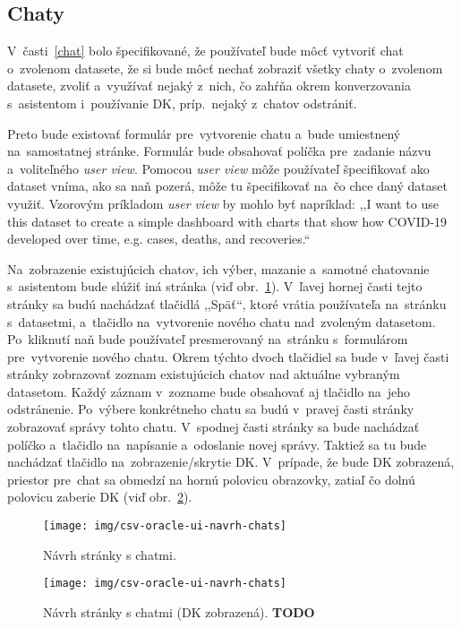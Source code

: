 \subsection{Chaty}

V~časti~\ref{chat} bolo špecifikované, že používateľ bude môcť vytvoriť chat o~zvolenom datasete, že si bude môcť nechať zobraziť všetky chaty o~zvolenom datasete, zvoliť a~využívať nejaký z~nich, čo zahŕňa okrem konverzovania s~asistentom i~používanie DK, príp.~nejaký z~chatov odstrániť.

Preto bude existovať formulár pre~vytvorenie chatu a~bude umiestnený na~samostatnej stránke. Formulár bude obsahovať políčka pre~zadanie názvu a~voliteľného \textit{user view}. Pomocou \textit{user view} môže používateľ špecifikovať ako dataset vníma, ako sa naň pozerá, môže tu špecifikovať na~čo chce daný dataset využiť. Vzorovým príkladom \textit{user view} by mohlo byť napríklad: ,,I want to use this dataset to create a simple dashboard with charts that show how COVID-19 developed over time, e.g. cases, deaths, and recoveries.``

Na~zobrazenie existujúcich chatov, ich výber, mazanie a~samotné chatovanie s~asistentom bude slúžiť iná stránka (viď obr.~\ref{csv-oracle-ui-navrh-chats}). V~ľavej hornej časti tejto stránky sa budú nachádzať tlačidlá ,,Späť``, ktoré vrátia používateľa na~stránku s~datasetmi, a~tlačidlo na~vytvorenie nového chatu nad~zvoleným datasetom. Po~kliknutí naň bude používateľ presmerovaný na~stránku s~formulárom pre~vytvorenie nového chatu. Okrem týchto dvoch tlačidiel sa bude v~ľavej časti stránky zobrazovať zoznam existujúcich chatov nad aktuálne vybraným datasetom. Každý záznam v~zozname bude obsahovať aj tlačidlo na~jeho odstránenie. Po~výbere konkrétneho chatu sa budú v~pravej časti stránky zobrazovať správy tohto chatu. V~spodnej časti stránky sa bude nachádzať políčko a~tlačidlo na~napísanie a~odoslanie novej správy. Taktiež sa tu bude nachádzať tlačidlo na~zobrazenie/skrytie DK. V~prípade, že bude DK zobrazená, priestor pre~chat sa obmedzí na hornú polovicu obrazovky, zatiaľ čo dolnú polovicu zaberie DK (viď obr.~\ref{csv-oracle-ui-navrh-chats-dk}).

\begin{figure}[H]\centering
\texttt{[image: img/csv-oracle-ui-navrh-chats]}
\caption{Návrh stránky s chatmi.}
\label{csv-oracle-ui-navrh-chats}
\end{figure}

\begin{figure}[H]\centering
\texttt{[image: img/csv-oracle-ui-navrh-chats]}
\caption{Návrh stránky s chatmi (DK zobrazená). \textbf{TODO}}
\label{csv-oracle-ui-navrh-chats-dk}
\end{figure}

